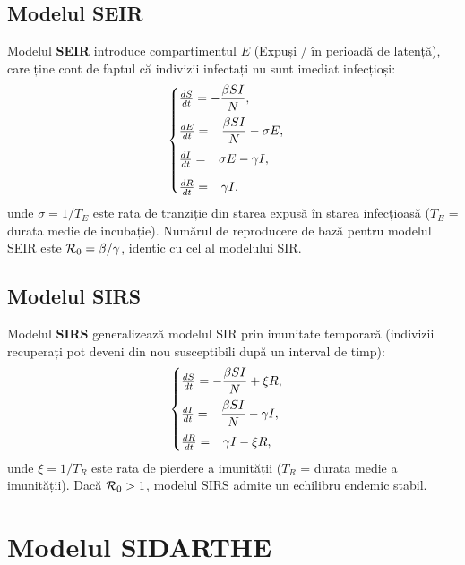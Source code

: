 \subsection{Modelul SEIR}
\label{subsec:model_seir}

Modelul \textbf{SEIR} introduce compartimentul $E$ (Expuși / în perioadă de latență),
care ține cont de faptul că indivizii infectați nu sunt imediat infecțioși:
\begin{equation}
\label{eq:seir}
\begin{cases}
    \frac{dS}{dt} = -\dfrac{\beta S I}{N}, \\[8pt]
    \frac{dE}{dt} = \phantom{-}\dfrac{\beta S I}{N} - \sigma E, \\[8pt]
    \frac{dI}{dt} = \phantom{-}\sigma E - \gamma I, \\[8pt]
    \frac{dR}{dt} = \phantom{-}\gamma I,
\end{cases}
\end{equation}
unde $\sigma = 1/T_E$ este rata de tranziție din starea expusă în starea infecțioasă
($T_E$ = durata medie de incubație). Numărul de reproducere de bază pentru modelul
SEIR este $\mathcal{R}_0 = \beta/\gamma$, identic cu cel al modelului SIR.

\subsection{Modelul SIRS}
\label{subsec:model_sirs}

Modelul \textbf{SIRS} generalizează modelul SIR prin imunitate temporară (indivizii
recuperați pot deveni din nou susceptibili după un interval de timp):
\begin{equation}
\label{eq:sirs}
\begin{cases}
    \frac{dS}{dt} = -\dfrac{\beta S I}{N} + \xi R, \\[8pt]
    \frac{dI}{dt} = \phantom{-}\dfrac{\beta S I}{N} - \gamma I, \\[8pt]
    \frac{dR}{dt} = \phantom{-}\gamma I - \xi R,
\end{cases}
\end{equation}
unde $\xi = 1/T_R$ este rata de pierdere a imunității ($T_R$ = durata medie a
imunității). Dacă $\mathcal{R}_0 > 1$, modelul SIRS admite un echilibru endemic stabil.

\section{Modelul SIDARTHE}
\label{sec:model_sidarthe}

